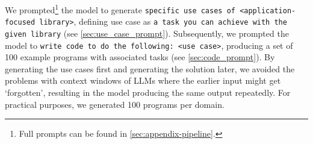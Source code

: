 We prompted\footnote{Full prompts can be found in \cref{sec:appendix-pipeline}.} the model to generate \texttt{specific use cases of <application-focused library>}, defining use case as \texttt{a task you can achieve 
with the given library} (see \cref{sec:use_case_prompt}). Subsequently, we prompted the model to \texttt{write code to do the following: <use case>}, producing a set of 100 example programs with associated tasks (see \cref{sec:code_prompt}). By generating the use cases first and generating the solution later, we avoided the problems with context windows of LLMs where the earlier input might get `forgotten', resulting in the model producing the same output repeatedly. For practical purposes, we generated 100 programs per domain. 

